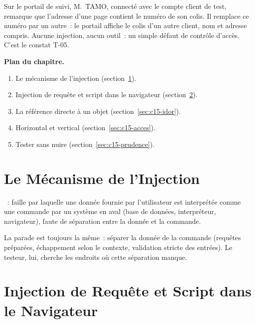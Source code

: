 Sur le portail de suivi, M.~TAMO, connecté avec le compte client de test,
remarque que l'adresse d'une page contient le numéro de son colis. Il
remplace ce numéro par un autre~: le portail affiche le colis d'un autre
client, nom et adresse compris. Aucune injection, aucun outil~: un simple
défaut de contrôle d'accès. C'est le constat T-05.

\medskip
\textbf{Plan du chapitre.}
\begin{enumerate}
    \item Le mécanisme de l'injection (section~\ref{sec:c15-mecanisme}).
    \item Injection de requête et script dans le navigateur
          (section~\ref{sec:c15-familles}).
    \item La référence directe à un objet (section~\ref{sec:c15-idor}).
    \item Horizontal et vertical (section~\ref{sec:c15-acces}).
    \item Tester sans nuire (section~\ref{sec:c15-prudence}).
\end{enumerate}

\separateur

\section{Le Mécanisme de l'Injection}
\label{sec:c15-mecanisme}

\begin{boxdef}
~: faille par laquelle une donnée fournie par
l'utilisateur est interprétée comme une commande par un système en aval
(base de données, interpréteur, navigateur), faute de séparation entre la
donnée et la commande.
\end{boxdef}

La parade est toujours la même~: séparer la donnée de la commande
(requêtes préparées, échappement selon le contexte, validation stricte des
entrées). Le testeur, lui, cherche les endroits où cette séparation
manque.

\section{Injection de Requête et Script dans le Navigateur}
\label{sec:c15-familles}

